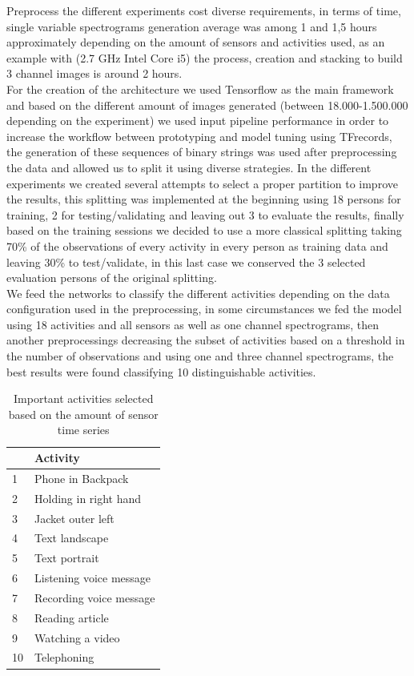 \documentclass[10pt,halfline,a4paper]{ouparticle}
\begin{document}
\noindent
Preprocess the different experiments cost diverse requirements, in terms of time, single variable spectrograms generation average was among 1 and 1,5 hours approximately depending on the amount  of sensors and activities used, as an example with (2.7 GHz Intel Core i5) the process, creation and stacking to build 3 channel images is around 2 hours.\\

\noindent
For the creation of the architecture we used Tensorflow as the main framework and based on the different amount of images generated (between 18.000-1.500.000 depending on the experiment) we used input pipeline performance in order to increase the workflow between prototyping and model tuning using TFrecords, the generation of these sequences of binary strings was used after preprocessing the data and allowed us to split it using diverse strategies. In the different experiments we created several attempts to select a proper partition to improve the results, this splitting was implemented at the beginning using 18 persons for training, 2 for testing/validating and leaving out 3 to evaluate the results, finally based on the training sessions we decided to use a more classical splitting taking 70\% of the observations of every activity in every person as training data and leaving 30\% to test/validate, in this last case we conserved the 3 selected evaluation persons of the original splitting.\\

\noindent
We feed the networks to classify the different activities depending on the data configuration used in the preprocessing, in some circumstances we fed the model using 18 activities and all sensors as well as one channel spectrograms, then another preprocessings decreasing the subset of activities based on a threshold in the number of observations and using one and three channel spectrograms, the best results were found classifying 10 distinguishable activities.
\begin{table}[H]
	\centering
	\begin{tabular}{|l|l|}
		\hline
		& Activity \\ \hline
		1 & Phone in Backpack \\ \hline
		2 & Holding in right hand \\ \hline
		3 & Jacket outer left \\ \hline
		4 & Text landscape \\ \hline
		5 & Text portrait \\ \hline
		6 & Listening voice message \\ \hline
		7 & Recording voice message \\ \hline
		8 & Reading article \\ \hline
		9 & Watching a video \\ \hline
		10 & Telephoning \\ \hline
	\end{tabular}
	\caption{Important activities selected based on the amount of sensor time series}
	\label{tab:my-table}
\end{table}
\end{document}
